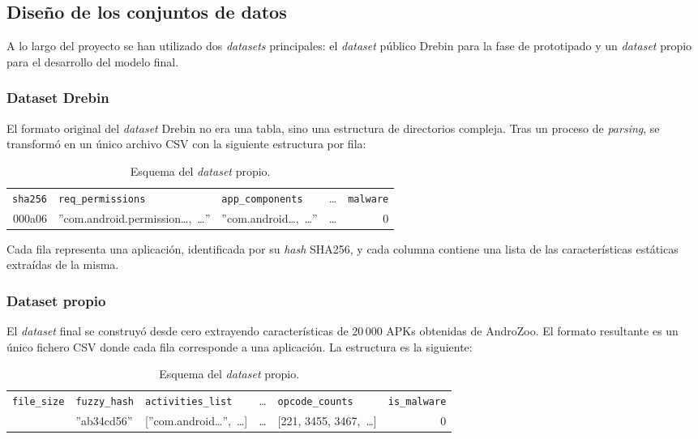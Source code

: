 \subsection{Diseño de los conjuntos de datos}
A lo largo del proyecto se han utilizado dos \textit{datasets} principales: el \textit{dataset} público Drebin para la fase de prototipado y un \textit{dataset} propio para el desarrollo del modelo final.

\subsubsection{Dataset Drebin}
El formato original del \textit{dataset} Drebin no era una tabla, sino una estructura de directorios compleja. Tras un proceso de \textit{parsing}, se transformó en un único archivo CSV con la siguiente estructura por fila:

\begin{table}[h!]
	\centering
	\begin{adjustbox}{max width=\textwidth}
		\begin{tabular}{r l l l r}
			\toprule
			\texttt{sha256} & \texttt{req\_permissions} & \texttt{app\_components} & \dots{} & \texttt{malware} \\
			\otoprule
			000a06 & ''com.android.permission\dots{},\, \dots{}'' & ''com.android\dots{},\, \dots{}'' & \dots{} & 0 \\
			\bottomrule
		\end{tabular}
	\end{adjustbox}
	\caption{Esquema del \textit{dataset} propio.}
	\label{tab:dataset_drebin}
\end{table}

Cada fila representa una aplicación, identificada por su \textit{hash} SHA256, y cada columna contiene una lista de las características estáticas extraídas de la misma.

\subsubsection{Dataset propio}
El \textit{dataset} final se construyó desde cero extrayendo características de 20\,000 APKs obtenidas de AndroZoo. El formato resultante es un único fichero CSV donde cada fila corresponde a una aplicación. La estructura es la siguiente:

\begin{table}[h!]
	\centering
	\begin{adjustbox}{max width=\textwidth}
		\begin{tabular}{r l l l l r}
			\toprule
			\texttt{file\_size} & \texttt{fuzzy\_hash} & \texttt{activities\_list} & \dots{} & \texttt{opcode\_counts} & \texttt{is\_malware} \\
			\otoprule
			321245 & ''ab34cd56'' & [''com.android\dots{}'',\, \dots{}] & \dots{} & [221, 3455, 3467,\, \dots{}] & 0 \\
			\bottomrule
		\end{tabular}
	\end{adjustbox}
	\caption{Esquema del \textit{dataset} propio.}
	\label{tab:dataset_propio}
\end{table}

